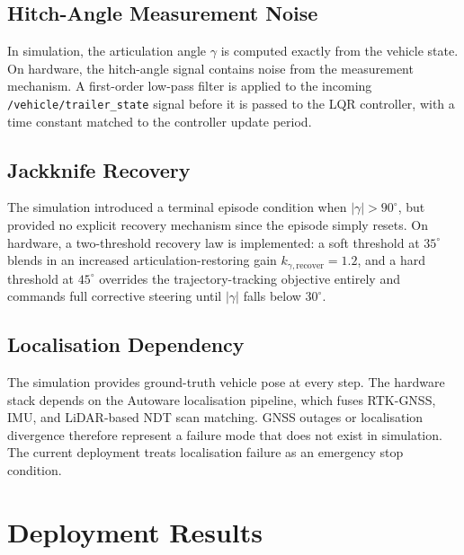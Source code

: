 \subsection{Hitch-Angle Measurement Noise}

In simulation, the articulation angle $\gamma$ is computed exactly from the vehicle state. On hardware, the hitch-angle signal contains noise from the measurement mechanism. A first-order low-pass filter is applied to the incoming \texttt{/vehicle/trailer\_state} signal before it is passed to the LQR controller, with a time constant matched to the controller update period.

\subsection{Jackknife Recovery}

The simulation introduced a terminal episode condition when $|\gamma| > 90^\circ$, but provided no explicit recovery mechanism since the episode simply resets. On hardware, a two-threshold recovery law is implemented: a soft threshold at $35^\circ$ blends in an increased articulation-restoring gain $k_{\gamma,\text{recover}} = 1.2$, and a hard threshold at $45^\circ$ overrides the trajectory-tracking objective entirely and commands full corrective steering until $|\gamma|$ falls below $30^\circ$.

\subsection{Localisation Dependency}

The simulation provides ground-truth vehicle pose at every step. The hardware stack depends on the Autoware localisation pipeline, which fuses RTK-GNSS, IMU, and LiDAR-based NDT scan matching. GNSS outages or localisation divergence therefore represent a failure mode that does not exist in simulation. The current deployment treats localisation failure as an emergency stop condition.

\section{Deployment Results}


